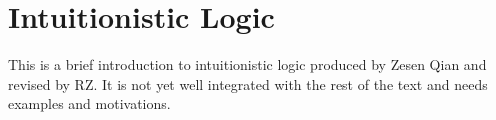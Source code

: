 \documentclass[../../include/open-logic-part]{subfiles}
\begin{document}
\part{Intuitionistic Logic}

\begin{editorial}
  This is a brief introduction to intuitionistic logic produced by
  Zesen Qian and revised by RZ. It is not yet well integrated with the
  rest of the text and needs examples and motivations.
\end{editorial}





\OLEndPartHook
\end{document}

